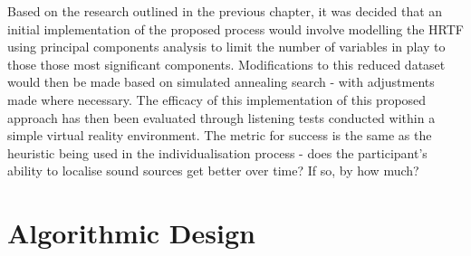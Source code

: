 Based on the research outlined in the previous chapter, it was decided that an initial implementation of the proposed process would involve modelling the HRTF using principal components analysis to limit the number of variables in play to those those most significant components. Modifications to this reduced dataset would then be made based on simulated annealing search - with adjustments made where necessary. The efficacy of this implementation of this proposed approach has then been evaluated through listening tests conducted within a simple virtual reality environment. The metric for success is the same as the heuristic being used in the individualisation process - does the participant's ability to localise sound sources get better over time? If so, by how much?

\section{Algorithmic Design}
